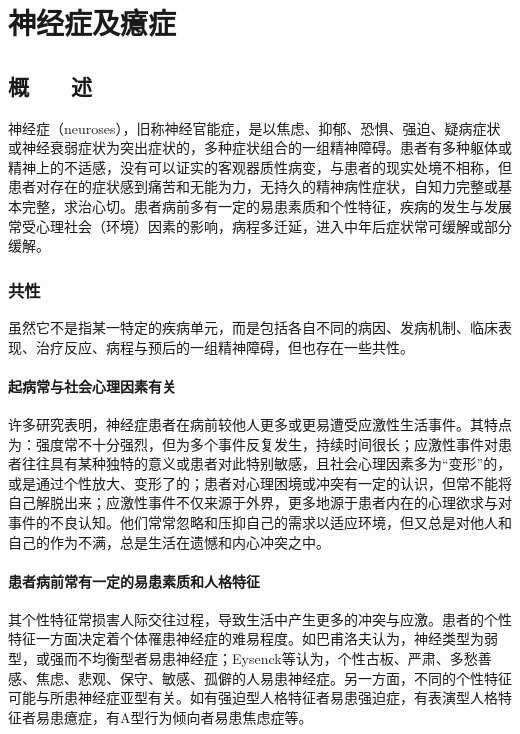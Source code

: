 \chapter{神经症及癔症}

\section{概　　述}

神经症（neuroses），旧称神经官能症，是以焦虑、抑郁、恐惧、强迫、疑病症状或神经衰弱症状为突出症状的，多种症状组合的一组精神障碍。患者有多种躯体或精神上的不适感，没有可以证实的客观器质性病变，与患者的现实处境不相称，但患者对存在的症状感到痛苦和无能为力，无持久的精神病性症状，自知力完整或基本完整，求治心切。患者病前多有一定的易患素质和个性特征，疾病的发生与发展常受心理社会（环境）因素的影响，病程多迁延，进入中年后症状常可缓解或部分缓解。

\subsection{共性}

虽然它不是指某一特定的疾病单元，而是包括各自不同的病因、发病机制、临床表现、治疗反应、病程与预后的一组精神障碍，但也存在一些共性。

\subsubsection{起病常与社会心理因素有关}

许多研究表明，神经症患者在病前较他人更多或更易遭受应激性生活事件。其特点为：强度常不十分强烈，但为多个事件反复发生，持续时间很长；应激性事件对患者往往具有某种独特的意义或患者对此特别敏感，且社会心理因素多为“变形”的，或是通过个性放大、变形了的；患者对心理困境或冲突有一定的认识，但常不能将自己解脱出来；应激性事件不仅来源于外界，更多地源于患者内在的心理欲求与对事件的不良认知。他们常常忽略和压抑自己的需求以适应环境，但又总是对他人和自己的作为不满，总是生活在遗憾和内心冲突之中。

\subsubsection{患者病前常有一定的易患素质和人格特征}

其个性特征常损害人际交往过程，导致生活中产生更多的冲突与应激。患者的个性特征一方面决定着个体罹患神经症的难易程度。如巴甫洛夫认为，神经类型为弱型，或强而不均衡型者易患神经症；Eysenck等认为，个性古板、严肃、多愁善感、焦虑、悲观、保守、敏感、孤僻的人易患神经症。另一方面，不同的个性特征可能与所患神经症亚型有关。如有强迫型人格特征者易患强迫症，有表演型人格特征者易患癔症，有A型行为倾向者易患焦虑症等。

